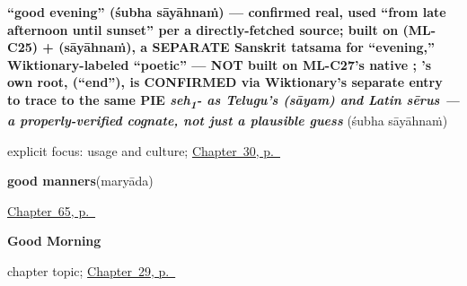 \noindent\begin{minipage}[t]{\linewidth}
\raggedright
\textbf{\textquotedblleft{}good evening\textquotedblright{} (śubha sāyāhnaṁ) — confirmed real, used \textquotedblleft{}from late afternoon until sunset\textquotedblright{} per a directly-fetched source; built on  (ML-C25) +  (sāyāhnaṁ), a SEPARATE Sanskrit tatsama for \textquotedblleft{}evening,\textquotedblright{} Wiktionary-labeled \textquotedblleft{}poetic\textquotedblright{} — NOT built on ML-C27's native ; 's own root,  (\textquotedblleft{}end\textquotedblright{}), is CONFIRMED via Wiktionary's separate  entry to trace to the same PIE \emph{seh\textsubscript{1}- as Telugu's  (sāyam) and Latin sērus — a properly-verified cognate, not just a plausible guess}}\enspace\emph{ }\enspace(śubha sāyāhnaṁ)\par
\footnotesize explicit focus: usage and culture; \hyperref[ch:ml-good-evening]{Chapter~30, p.~\pageref*{ch:ml-good-evening}}
\end{minipage}\par\smallskip

\noindent\begin{minipage}[t]{\linewidth}
\raggedright
\textbf{good manners}\enspace\emph{}\enspace(maryāda)\par
\footnotesize \hyperref[ch:ml-asking-well]{Chapter~65, p.~\pageref*{ch:ml-asking-well}}
\end{minipage}\par\smallskip

\noindent\begin{minipage}[t]{\linewidth}
\raggedright
\textbf{Good Morning}\par
\footnotesize chapter topic; \hyperref[ch:ml-good-morning]{Chapter~29, p.~\pageref*{ch:ml-good-morning}}
\end{minipage}\par\smallskip

